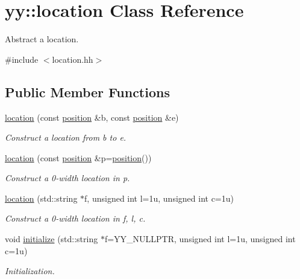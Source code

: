 \hypertarget{classyy_1_1location}{}\section{yy\+:\+:location Class Reference}
\label{classyy_1_1location}


Abstract a location.  




{\ttfamily \#include $<$location.\+hh$>$}

\subsection*{Public Member Functions}
\begin{DoxyCompactItemize}
\item 
\mbox{\label{classyy_1_1location_a0d659c37bcd57075c7bb25e600d3f526}} 
\hyperlink{classyy_1_1location_a0d659c37bcd57075c7bb25e600d3f526}{location} (const \hyperlink{classyy_1_1position}{position} \&b, const \hyperlink{classyy_1_1position}{position} \&e)
\begin{DoxyCompactList}\small\item\em Construct a location from {\itshape b} to {\itshape e}. \end{DoxyCompactList}\item 
\mbox{\label{classyy_1_1location_a378c53e8dc67416748f0b12844919e51}} 
\hyperlink{classyy_1_1location_a378c53e8dc67416748f0b12844919e51}{location} (const \hyperlink{classyy_1_1position}{position} \&p=\hyperlink{classyy_1_1position}{position}())
\begin{DoxyCompactList}\small\item\em Construct a 0-\/width location in {\itshape p}. \end{DoxyCompactList}\item 
\mbox{\label{classyy_1_1location_a75594362f84338b764164cd632ee7d9e}} 
\hyperlink{classyy_1_1location_a75594362f84338b764164cd632ee7d9e}{location} (std\+::string $\ast$f, unsigned int l=1u, unsigned int c=1u)
\begin{DoxyCompactList}\small\item\em Construct a 0-\/width location in {\itshape f}, {\itshape l}, {\itshape c}. \end{DoxyCompactList}\item 
\mbox{\label{classyy_1_1location_ac21a2ea2c80bb267f0f44a6517e8ac17}} 
void \hyperlink{classyy_1_1location_ac21a2ea2c80bb267f0f44a6517e8ac17}{initialize} (std\+::string $\ast$f=Y\+Y\+\_\+\+N\+U\+L\+L\+P\+TR, unsigned int l=1u, unsigned int c=1u)
\begin{DoxyCompactList}\small\item\em Initialization. \end{DoxyCompactList}\end{DoxyCompactItemize}
